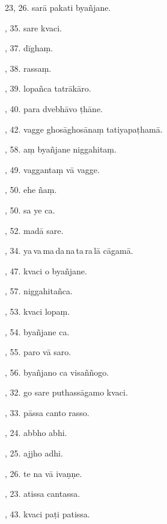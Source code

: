 23, 26. sarā pakati byañjane.\hfill \pageref{sut:23}\par {}, 35. sare kvaci.\hfill \pageref{sut:24}\par {}, 37. dīghaṃ.\hfill \pageref{sut:25}\par {}, 38. rassaṃ.\hfill \pageref{sut:26}\par {}, 39. lopañca tatrākāro.\hfill \pageref{sut:27}\par {}, 40. para dvebhāvo ṭhāne.\hfill \pageref{sut:28}\par {}, 42. vagge ghosāghosānaṃ tatiyapaṭhamā.\hfill \pageref{sut:29}\par {}, 58. aṃ byañjane niggahitaṃ.\hfill \pageref{sut:30}\par {}, 49. vaggantaṃ vā vagge.\hfill \pageref{sut:31}\par {}, 50. ehe ñaṃ.\hfill \pageref{sut:32}\par {}, 50. sa ye ca.\hfill \pageref{sut:33}\par {}, 52. madā sare.\hfill \pageref{sut:34}\par {}, 34. ya\,va\,ma\,da\,na\,ta\,ra\,lā cāgamā.\hfill \pageref{sut:35}\par {}, 47. kvaci o byañjane.\hfill \pageref{sut:36}\par {}, 57. niggahitañca.\hfill \pageref{sut:37}\par {}, 53. kvaci lopaṃ.\hfill \pageref{sut:38}\par {}, 54. byañjane ca.\hfill \pageref{sut:39}\par {}, 55. paro vā saro.\hfill \pageref{sut:40}\par {}, 56. byañjano ca visaññogo.\hfill \pageref{sut:41}\par {}, 32. go sare puthassāgamo kvaci.\hfill \pageref{sut:42}\par {}, 33. pāssa canto rasso.\hfill \pageref{sut:43}\par {}, 24. abbho abhi.\hfill \pageref{sut:44}\par {}, 25. ajjho adhi.\hfill \pageref{sut:45}\par {}, 26. te na vā ivaṇṇe.\hfill \pageref{sut:46}\par {}, 23. atissa cantassa.\hfill \pageref{sut:47}\par {}, 43. kvaci paṭi patissa.\hfill \pageref{sut:48}\par \noindent
